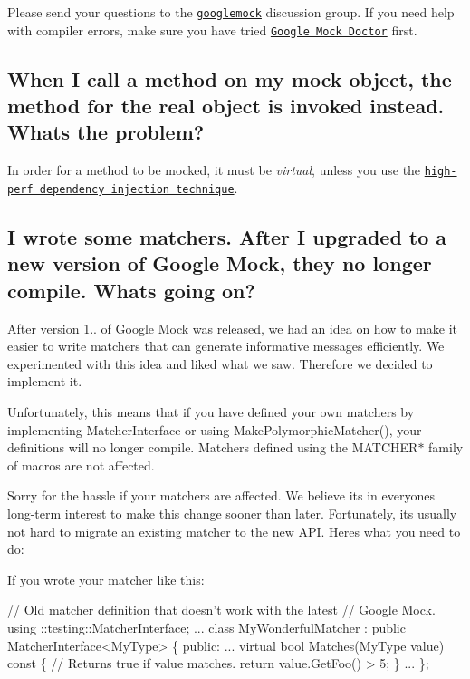 Please send your questions to the \href{http://groups.google.com/group/googlemock}{\tt googlemock} discussion group. If you need help with compiler errors, make sure you have tried \href{#how-am-i-supposed-to-make-sense-of-these-horrible-template-errors}{\tt Google Mock Doctor} first.

\subsection*{When I call a method on my mock object, the method for the real object is invoked instead. What\textquotesingle{}s the problem?}

In order for a method to be mocked, it must be {\itshape virtual}, unless you use the \href{CookBook.md#mocking-nonvirtual-methods}{\tt high-\/perf dependency injection technique}.

\subsection*{I wrote some matchers. After I upgraded to a new version of Google Mock, they no longer compile. What\textquotesingle{}s going on?}

After version 1.. of Google Mock was released, we had an idea on how to make it easier to write matchers that can generate informative messages efficiently. We experimented with this idea and liked what we saw. Therefore we decided to implement it.

Unfortunately, this means that if you have defined your own matchers by implementing {\ttfamily Matcher\+Interface} or using {\ttfamily Make\+Polymorphic\+Matcher()}, your definitions will no longer compile. Matchers defined using the {\ttfamily M\+A\+T\+C\+H\+E\+R$\ast$} family of macros are not affected.

Sorry for the hassle if your matchers are affected. We believe it\textquotesingle{}s in everyone\textquotesingle{}s long-\/term interest to make this change sooner than later. Fortunately, it\textquotesingle{}s usually not hard to migrate an existing matcher to the new A\+PI. Here\textquotesingle{}s what you need to do\+:

If you wrote your matcher like this\+: 
\begin{DoxyCode}
\textcolor{comment}{// Old matcher definition that doesn't work with the latest}
\textcolor{comment}{// Google Mock.}
using ::testing::MatcherInterface;
...
class MyWonderfulMatcher : \textcolor{keyword}{public} MatcherInterface<MyType> \{
 \textcolor{keyword}{public}:
  ...
  \textcolor{keyword}{virtual} \textcolor{keywordtype}{bool} Matches(MyType value)\textcolor{keyword}{ const }\{
    \textcolor{comment}{// Returns true if value matches.}
    \textcolor{keywordflow}{return} value.GetFoo() > 5;
  \}
  ...
\};
\end{DoxyCode}


